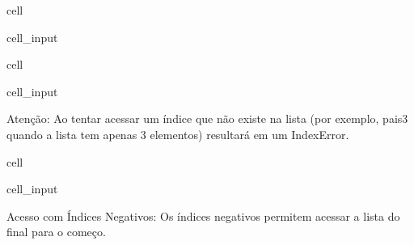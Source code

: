 \documentclass[letterpaper,10pt,english]{jupyterBook}
\begin{document}
\begin{sphinxuseclass}{cell}\begin{sphinxVerbatimInput}

\begin{sphinxuseclass}{cell_input}
\begin{sphinxVerbatim}[commandchars=\\\{\}]
  \PYG{p}{[}\PYG{p}{]}
\end{sphinxVerbatim}

\end{sphinxuseclass}\end{sphinxVerbatimInput}

\end{sphinxuseclass}
\begin{sphinxuseclass}{cell}\begin{sphinxVerbatimInput}

\begin{sphinxuseclass}{cell_input}
\begin{sphinxVerbatim}[commandchars=\\\{\}]
  \PYG{p}{[}\PYG{p}{]}
\end{sphinxVerbatim}

\end{sphinxuseclass}\end{sphinxVerbatimInput}

\end{sphinxuseclass}
\sphinxAtStartPar
Atenção:
Ao tentar acessar um índice que não existe na lista (por exemplo, pais3 quando a lista tem apenas 3 elementos) resultará em um IndexError.

\begin{sphinxuseclass}{cell}\begin{sphinxVerbatimInput}

\begin{sphinxuseclass}{cell_input}
\begin{sphinxVerbatim}[commandchars=\\\{\}]
\PYG{p}{[}\PYG{p}{]}
\end{sphinxVerbatim}

\end{sphinxuseclass}\end{sphinxVerbatimInput}

\end{sphinxuseclass}
\sphinxAtStartPar
Acesso com Índices Negativos:
Os índices negativos permitem acessar a lista do final para o começo.
\end{document}
